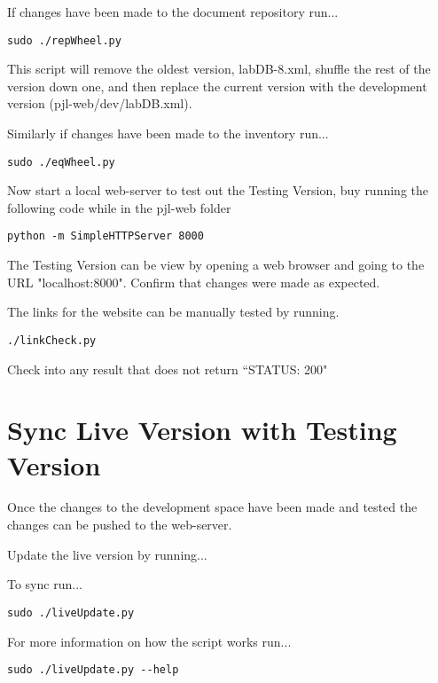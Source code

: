 \documentclass[justified]{pjlProcessDocs}
\begin{document}
If changes have been made to the document repository run...
\begin{lstlisting}[backgroundcolor = \color{light-gray}]
sudo ./repWheel.py
\end{lstlisting}

This script will remove the oldest version, labDB-8.xml, shuffle the rest of the version down one, and then replace the current version with the development version (pjl-web/dev/labDB.xml). 

Similarly if changes have been made to the inventory run...
\begin{lstlisting}[backgroundcolor = \color{light-gray}]
sudo ./eqWheel.py
\end{lstlisting}

Now start a local web-server to test out the Testing Version, buy running the following code while in the pjl-web folder

\begin{lstlisting}[backgroundcolor = \color{light-gray}]
python -m SimpleHTTPServer 8000
\end{lstlisting}

The Testing Version can be view by opening a web browser and going to the URL "localhost:8000". Confirm that changes were made as expected.

The links for the website can be manually tested by running.
\begin{lstlisting}[backgroundcolor = \color{light-gray}]
./linkCheck.py
\end{lstlisting}

Check into any result that does not return ``STATUS: 200"

\section{Sync Live Version with Testing Version}\label{sec:finalsync}

Once the changes to the development space have been made and tested the changes can be pushed to the web-server. 

Update the live version by running...

\noindent To sync run...
\begin{lstlisting}[backgroundcolor = \color{light-gray}]
sudo ./liveUpdate.py
\end{lstlisting}
\vspace{-1em}
\noindent For more information on how the script works run...

\begin{lstlisting}[backgroundcolor = \color{light-gray}]
sudo ./liveUpdate.py --help
\end{lstlisting}
\end{document}
